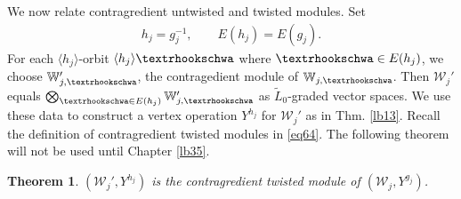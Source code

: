 \documentclass[11pt,b5paper,notitlepage]{article}
\theoremstyle{definition}
\theoremstyle{plain}
\newtheorem{thm}[df]{Theorem}
\newcommand{\mc}{\mathcal}
\newcommand{\wtd}{\widetilde}
\newcommand{\bk}[1]{\langle {#1}\rangle}
\newcommand{\Wbb}{\mathbb W}
\newcommand{\tipae}{\text{\textrhookschwa}}
\numberwithin{equation}{subsection}
\begin{document}
We now relate contragredient untwisted and twisted modules. Set
\begin{align}
h_j=g_j^{-1},\qquad E(h_j)=E(g_j).	
\end{align}
For each $\bk{h_j}$-orbit $\bk{h_j}\tipae$ where $\tipae\in E(h_j)$, we choose $\Wbb_{j,\tipae}'$, the contragedient module of $\Wbb_{j,\tipae}$. Then $\mc W_j'$ equals $\bigotimes_{\tipae\in E(h_j)}\Wbb_{j,\tipae}'$ as $\wtd L_0$-graded vector spaces. We use these data to construct a vertex operation $Y^{h_j}$ for $\mc W_j'$ as in Thm. \ref{lb13}. Recall the definition of contragredient twisted modules in \eqref{eq64}. The following theorem will not be used until Chapter \ref{lb35}.

\begin{thm}\label{lb42}
$(\mc W_j',Y^{h_j})$ is the contragredient twisted module of $(\mc W_j,Y^{g_j})$.
\end{thm}
\end{document}
